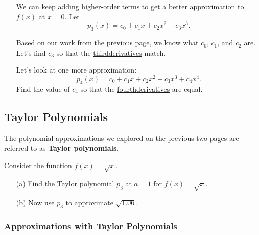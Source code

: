 \documentclass[12pt]{article}
\begin{document}
\newpage

\begin{enumerate}
\item[\tc{3}] We can keep adding higher-order terms to get a better approximation to $f(x)$ at $x=0$. Let 
$$p_3(x)=c_0+c_1x+c_2x^2+c_3x^3.$$

Based on our work from the previous page, we know what $c_0$, $c_1$, and $c_2$ are. Let's find $c_3$ so that the \underline{third\phantom{y}derivatives} match.

\vfill

\item[\tc{4}] Let's look at one more approximation:
$$p_4(x)=c_0+c_1x+c_2x^2+c_3x^3+c_4x^4.$$
Find the value of $c_4$ so that the \underline{fourth\phantom{y}derivatives} are equal. 

\vfill
\end{enumerate}

\newpage

\subsection*{Taylor Polynomials}

The polynomial approximations we explored on the previous two pages are referred to as \textbf{Taylor polynomials}.

\vspace{5mm}


\vspace{10mm}

\Example Consider the function $f(x)=\sqrt{x}$.

\begin{enumerate}
\item[(a)] Find the Taylor polynomial $p_3$ at $a=1$ for $f(x)=\sqrt{x}$.

\vfill

\vfill

\item[(b)] Now use $p_3$ to approximate $\sqrt{1.06}$.

\vfill
\end{enumerate}

\newpage

\subsubsection*{Approximations with Taylor Polynomials}
\end{document}
